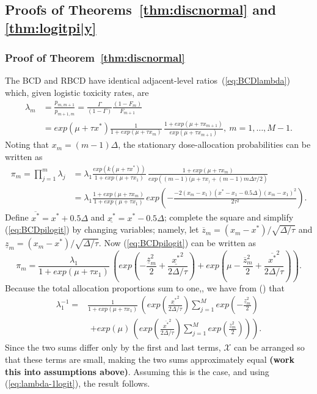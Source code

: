 \subsection{Proofs of Theorems~\ref{thm:discnormal} and \ref{thm:logitpi|y}}\label{sec:logitproofs}
\subsubsection{Proof of Theorem~\ref{thm:discnormal}}
The BCD and RBCD have identical adjacent-level ratios~(\ref{eq:BCDlambda}) which, given logistic toxicity rates, are
\begin{align*}
\lambda_m&=\frac{p_{m,m+1}}{p_{m+1,m}}
=\frac{\Gamma }{(1-\Gamma)}\frac{(1-F_m)}{F_{m+1}}
\\&=exp\left(\mu+\tau x^*\right)\frac{1}{1+exp\left(\mu+\tau x_m\right)}\, 
\frac{1+exp\left(\mu+\tau x_{m+1}\right)}{exp\left(\mu+\tau x_{m+1}\right)}, \ m=1,\ldots,M-1.
\end{align*} 
Noting that $x_m=(m-1)\Delta$, the stationary dose-allocation probabilities can be written as
\begin{align*}\label{eq:BCDpilogit}
\pi_{m}=\prod_{j=1}^m \lambda_j &= \lambda_1 \frac{exp(k (\mu+\tau x^*))}{1+exp\left(\mu+\tau x_1\right)}\,
\frac{1+exp\left(\mu+\tau x_m\right)}{exp\left((m-1)(\mu+\tau x_)+(m-1)m \Delta \tau/2\right)}\\
&= \lambda_1 \frac{1+exp\left(\mu+\tau x_m\right)}{1+exp\left(\mu+\tau x_1\right)}\,
exp\left(-\frac{-2\left(x_m-x_1\right)\left(x^*-x_1-0.5\Delta\right)\left(x_m-x_1\right)^2}{2\tau^2}
\right).
\end{align*}
Define $\overline{x^*}=x^*+0.5\Delta$ and $\underline{x^*}=x^*-0.5\Delta$; complete the square and simplify (\ref{eq:BCDpilogit}) by changing variables; namely, let 
$\overline{z}_m=(x_m-x^*)/\sqrt{\Delta/\tau}$ and $\underline{z}_m=(x_m-x^*)/\sqrt{\Delta/\tau}$.  Now (\ref{eq:BCDpilogit}) can be written as
\begin{equation}
\pi_{m}= \frac{\lambda_1}{1+exp\left(\mu+\tau x_1\right)}\,
\left(exp\left(-\frac{\underline{z}_m^2}{2}+\frac{\underline{x^*}^2}{2\Delta/\tau}\right)
+exp\left(\mu-\frac{\overline{z}_m^2}{2}+\frac{\overline{x^*}^2}{2\Delta/\tau}\right)\right).
\end{equation}
Because the total allocation proportions sum to one,, we have from () that
\begin{align}\label{eq:lamda-1logit}
\lambda_1^{-1}= & \frac{1}{1+exp\left(\mu+\tau x_1\right)}\,
\left(exp\left(\frac{\underline{x^*}^2}{2\Delta/\tau}\right)\sum_{j=1}^M exp\left(-\frac{\underline{z}_m^2}{2}\right)\right.\\
&\, \,\left. +exp(\mu)\, \left(exp\left(\frac{\overline{x^*}^2}{2\Delta/\tau}\right)
\sum_{j=1}^M exp\left(\frac{\overline{z}_m^2}{2}\right)\right)\right).
\end{align}
Since the two sums differ only by the first and last terms, $\mathcal{X}$ can be arranged so that these terms are small, making the two sums approximately equal {\bf(work this into assumptions above)}.  Assuming this is the case, and using (\ref{eq:lambda-1logit}), the result follows.

